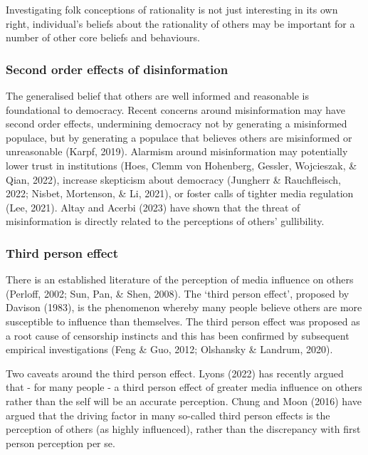 \documentclass[
  ,jou,floatsintext]{apa6}
\begin{document}
Investigating folk conceptions of rationality is not just interesting in its own right, individual's beliefs about the rationality of others may be important for a number of other core beliefs and behaviours.

\hypertarget{second-order-effects-of-disinformation}{%
\subsubsection{Second order effects of disinformation}\label{second-order-effects-of-disinformation}}

The generalised belief that others are well informed and reasonable is foundational to democracy. Recent concerns around misinformation may have second order effects, undermining democracy not by generating a misinformed populace, but by generating a populace that believes others are misinformed or unreasonable (Karpf, 2019). Alarmism around misinformation may potentially lower trust in institutions (Hoes, Clemm von Hohenberg, Gessler, Wojcieszak, \& Qian, 2022), increase skepticism about democracy (Jungherr \& Rauchfleisch, 2022; Nisbet, Mortenson, \& Li, 2021), or foster calls of tighter media regulation (Lee, 2021). Altay and Acerbi (2023) have shown that the threat of misinformation is directly related to the perceptions of others' gullibility.

\hypertarget{third-person-effect}{%
\subsubsection{Third person effect}\label{third-person-effect}}

There is an established literature of the perception of media influence on others (Perloff, 2002; Sun, Pan, \& Shen, 2008). The `third person effect', proposed by Davison (1983), is the phenomenon whereby many people believe others are more susceptible to influence than themselves. The third person effect was proposed as a root cause of censorship instincts and this has been confirmed by subsequent empirical investigations (Feng \& Guo, 2012; Olshansky \& Landrum, 2020).

Two caveats around the third person effect. Lyons (2022) has recently argued that - for many people - a third person effect of greater media influence on others rather than the self will be an accurate perception. Chung and Moon (2016) have argued that the driving factor in many so-called third person effects is the perception of others (as highly influenced), rather than the discrepancy with first person perception per se.
\end{document}
